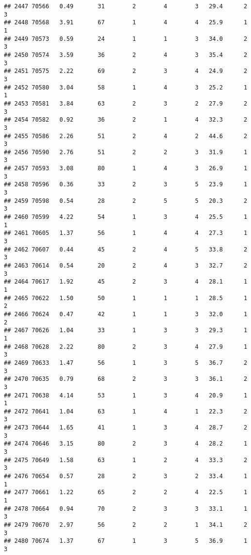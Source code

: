 \documentclass[
]{article}
\begin{document}
\begin{verbatim}
## 2447 70566   0.49       31        2        4        3   29.4      2      3
## 2448 70568   3.91       67        1        4        4   25.9      1      1
## 2449 70573   0.59       24        1        1        3   34.0      2      3
## 2450 70574   3.59       36        2        4        3   35.4      2      3
## 2451 70575   2.22       69        2        3        4   24.9      2      3
## 2452 70580   3.04       58        1        4        3   25.2      1      1
## 2453 70581   3.84       63        2        3        2   27.9      2      3
## 2454 70582   0.92       36        2        1        4   32.3      2      3
## 2455 70586   2.26       51        2        4        2   44.6      2      3
## 2456 70590   2.76       51        2        2        3   31.9      1      3
## 2457 70593   3.08       80        1        4        3   26.9      1      3
## 2458 70596   0.36       33        2        3        5   23.9      1      3
## 2459 70598   0.54       28        2        5        5   20.3      2      3
## 2460 70599   4.22       54        1        3        4   25.5      1      1
## 2461 70605   1.37       56        1        4        4   27.3      1      3
## 2462 70607   0.44       45        2        4        5   33.8      2      3
## 2463 70614   0.54       20        2        4        3   32.7      2      3
## 2464 70617   1.92       45        2        3        4   28.1      1      1
## 2465 70622   1.50       50        1        1        1   28.5      1      2
## 2466 70624   0.47       42        1        1        3   32.0      1      2
## 2467 70626   1.04       33        1        3        3   29.3      1      1
## 2468 70628   2.22       80        2        3        4   27.9      1      3
## 2469 70633   1.47       56        1        3        5   36.7      2      3
## 2470 70635   0.79       68        2        3        3   36.1      2      3
## 2471 70638   4.14       53        1        3        4   20.9      1      1
## 2472 70641   1.04       63        1        4        1   22.3      2      3
## 2473 70644   1.65       41        1        3        4   28.7      2      3
## 2474 70646   3.15       80        2        3        4   28.2      1      3
## 2475 70649   1.58       63        1        2        4   33.3      2      3
## 2476 70654   0.57       28        2        3        2   33.4      1      1
## 2477 70661   1.22       65        2        2        4   22.5      1      1
## 2478 70664   0.94       70        2        3        3   33.1      1      3
## 2479 70670   2.97       56        2        2        1   34.1      2      3
## 2480 70674   1.37       67        1        3        5   36.9      1      3

\end{verbatim}
\end{document}
